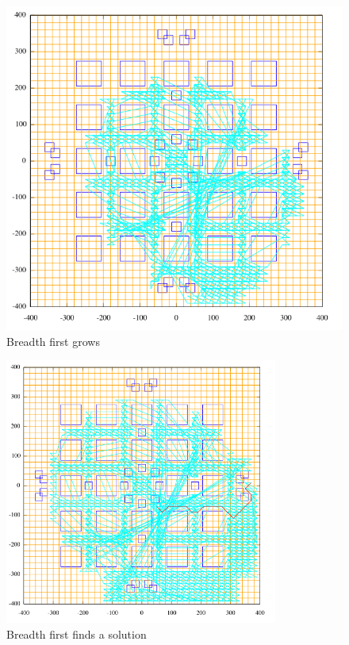 \begin{figure}
\begin{minipage}[b]{0.3\linewidth}
\end{minipage}
\hspace{0.5cm} %
\begin{minipage}[b]{0.3\linewidth}
\centering
\includegraphics[width=0.9\linewidth]{bf3.png}
\end{minipage}
\caption{Breadth first grows}
\end{figure}

\begin{figure}\label{fig:bfsol}
\begin{center}\centering
\includegraphics[width=0.8\textwidth]{bf4.png}
\caption{Breadth first finds a solution}
\end{center}
\end{figure}

